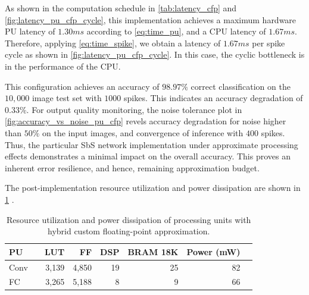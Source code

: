 As shown in the computation schedule in \ref{tab:latency_cfp} and \ref{fig:latency_pu_cfp_cycle}, this implementation achieves a maximum hardware PU latency of $1.30 ms$ according to \ref{eq:time_pu}, and a CPU latency of $1.67 ms$. Therefore, applying \ref{eq:time_spike}, we obtain a latency of $1.67 ms$ per spike cycle as shown in \ref{fig:latency_pu_cfp_cycle}. In this case, the cyclic bottleneck is in the performance of the CPU.

This configuration achieves an accuracy of $98.97\%$ correct classification on the $10,000$ image test set with $1000$ spikes. This indicates an accuracy degradation of $0.33\%$. For output quality monitoring, the noise tolerance plot in \ref{fig:accuracy_vs_noise_pu_cfp} revels accuracy degradation for noise higher than $50\%$ on the input images, and convergence of inference with $400$ spikes. Thus, the particular SbS network implementation under approximate processing effects demonstrates a minimal impact on the overall accuracy. This proves an inherent error resilience, and hence, remaining approximation budget.

The post-implementation resource utilization and power dissipation
are shown in \ref{tab:resource_cfp}
.

\begin{table}[h!]\centering
	\caption{Resource utilization and power dissipation of processing units with hybrid custom floating-point approximation.}\label{tab:resource_cfp}
	\scriptsize
	\begin{tabular}{lrrrrrrr}\toprule
		\textbf{PU} & &\textbf{LUT} &\textbf{FF} &\textbf{DSP} &\textbf{BRAM 18K} &\textbf{Power (mW)} \\\midrule
		Conv & &3,139 &4,850 &19 &25 &82 \\
		FC & &3,265 &5,188 &8 &9 &66 \\
		\bottomrule
	\end{tabular}
\end{table}



